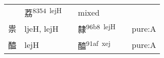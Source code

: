 \documentclass[14pt,a4paper]{scrartcl}
\begin{document}
\begin{longtable}[c]{@{}llllll@{}}
\begin{minipage}[t]{0.14\columnwidth}
\strut\end{minipage} &
\begin{minipage}[t]{0.14\columnwidth}\raggedright\strut
荔\textsuperscript{8354~lejH}
\strut\end{minipage} &
\begin{minipage}[t]{0.14\columnwidth}\raggedright\strut
\strut\end{minipage} &
\begin{minipage}[t]{0.14\columnwidth}\raggedright\strut
mixed
\strut\end{minipage}\tabularnewline
\begin{minipage}[t]{0.14\columnwidth}\raggedright\strut
祟
\strut\end{minipage} &
\begin{minipage}[t]{0.14\columnwidth}\raggedright\strut
ljeH, lejH
\strut\end{minipage} &
\begin{minipage}[t]{0.14\columnwidth}\raggedright\strut
\strut\end{minipage} &
\begin{minipage}[t]{0.14\columnwidth}\raggedright\strut
隸\textsuperscript{96b8~lejH}
\strut\end{minipage} &
\begin{minipage}[t]{0.14\columnwidth}\raggedright\strut
\strut\end{minipage} &
\begin{minipage}[t]{0.14\columnwidth}\raggedright\strut
pure:A
\strut\end{minipage}\tabularnewline
\begin{minipage}[t]{0.14\columnwidth}\raggedright\strut
醯
\strut\end{minipage} &
\begin{minipage}[t]{0.14\columnwidth}\raggedright\strut
lejH
\strut\end{minipage} &
\begin{minipage}[t]{0.14\columnwidth}\raggedright\strut
\strut\end{minipage} &
\begin{minipage}[t]{0.14\columnwidth}\raggedright\strut
醯\textsuperscript{91af~xej}
\strut\end{minipage} &
\begin{minipage}[t]{0.14\columnwidth}\raggedright\strut
\strut\end{minipage} &
\begin{minipage}[t]{0.14\columnwidth}\raggedright\strut
pure:A
\strut\end{minipage}\tabularnewline

\end{longtable}
\end{document}
